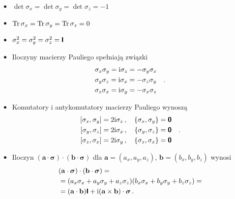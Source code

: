 \documentclass{myclass}
\begin{document}
\begin{itemize}
    
    \item \(\det\sigma_x = \det\sigma_y = \det\sigma_z = -1\)

    \item \(\Tr\sigma_x = \Tr\sigma_y = \Tr\sigma_z = 0\)

    \item \(\sigma_x^2 = \sigma_y^2 = \sigma_z^2 = \boldsymbol{\mathsf{I}}\)

    \item Iloczyny macierzy Pauliego spełniają związki
    \begin{equation*}
        \begin{split}
            &\sigma_x\sigma_y = \mathrm{i}\sigma_z = -\sigma_y\sigma_x \\
            &\sigma_y\sigma_z = \mathrm{i}\sigma_x = -\sigma_z\sigma_y \\
            &\sigma_z\sigma_x = \mathrm{i}\sigma_y = -\sigma_x\sigma_z
        \end{split}\quad.
    \end{equation*}

    \item Komutatory i antykomutatory macierzy Pauliego wynoszą
    \begin{equation*}
        \begin{split}
            [\sigma_x,\sigma_y] = 2\mathrm{i}\sigma_z\,,\quad \{\sigma_x, \sigma_y\} = \boldsymbol{\mathsf{\mathsf{0}}}\\
            [\sigma_y,\sigma_z] = 2\mathrm{i}\sigma_x\,,\quad \{\sigma_y, \sigma_z\} = \boldsymbol{\mathsf{\mathsf{0}}}\\
            [\sigma_z,\sigma_x] = 2\mathrm{i}\sigma_y\,,\quad \{\sigma_z, \sigma_x\} = \boldsymbol{\mathsf{\mathsf{0}}}\\
        \end{split}\quad.
    \end{equation*}

    \item Iloczyn \((\mathbf{a}\cdot\boldsymbol{\sigma})\cdot(\mathbf{b}\cdot\boldsymbol{\sigma})\)
    dla \(\mathbf{a} = (a_x,a_y,a_z)\), \(\mathbf{b}=(b_x,b_y,b_z)\) wynosi
    \begin{equation*}
        \begin{split}
            &(\mathbf{a}\cdot\boldsymbol{\sigma})\cdot(\mathbf{b}\cdot\boldsymbol{\sigma}) = \\
            &= (a_x\sigma_x + a_y\sigma_y + a_z\sigma_z)(b_x\sigma_x + b_y\sigma_y + b_z\sigma_z) =\\
            &= (\mathbf{a}\cdot\mathbf{b})\boldsymbol{\mathsf{I}} + \mathrm{i}(\mathbf{a}\times\mathbf{b})\cdot\boldsymbol{\sigma}\,.
        \end{split}
    \end{equation*}


\end{itemize}
\end{document}
